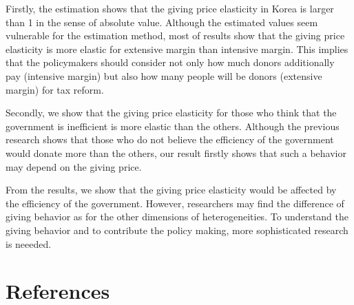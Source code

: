 \documentclass[ review  , 3p ]{elsarticle}
\begin{document}
  Firstly, the estimation shows that the giving price elasticity in Korea is larger than 1 in the sense of absolute value. Although the estimated values seem vulnerable for the estimation method, most of results show that the giving price elasticity is more elastic for extensive margin than intensive margin. This implies that the policymakers should consider not only how much donors additionally pay (intensive margin) but also how many people will be donors (extensive margin) for tax reform.

  Secondly, we show that the giving price elasticity for those who think that the government is inefficient is more elastic than the others. Although the previous research shows that those who do not believe the efficiency of the government would donate more than the others, our result firstly shows that such a behavior may depend on the giving price.

  From the results, we show that the giving price elasticity would be affected by the efficiency of the government. However, researchers may find the difference of giving behavior as for the other dimensions of heterogeneities. To understand the giving behavior and to contribute the policy making, more sophisticated research is neeeded.

  \clearpage

  \hypertarget{references}{%
  \section*{References}\label{references}}
\end{document}
